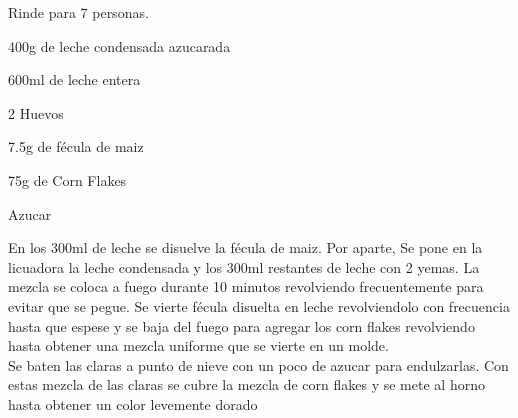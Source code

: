 
Rinde para 7 personas.

\begin{ingredientes}
\item 400g de leche condensada azucarada
\item 600ml de leche entera
\item 2 Huevos
\item 7.5g de fécula de maiz
\item 75g de Corn Flakes
\item Azucar
\end{ingredientes}
\preparacion
En los 300ml de leche se disuelve la fécula de maiz. Por aparte,
Se pone en la licuadora la leche condensada y los 300ml restantes de leche con 2 yemas. La mezcla se coloca a fuego durante 10 minutos revolviendo frecuentemente para evitar que se pegue. Se vierte fécula disuelta en leche revolviendolo con frecuencia hasta que espese y se baja del fuego para agregar los corn flakes revolviendo hasta obtener una mezcla uniforme que se vierte en un molde.\\

Se baten las claras a punto de nieve con un poco de azucar para endulzarlas. Con estas mezcla de las claras se cubre la mezcla de corn flakes y se mete al horno hasta obtener un color levemente dorado\\